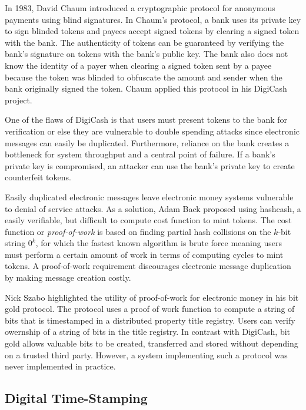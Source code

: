 In 1983, David Chaum introduced a cryptographic protocol for anonymous payments using
blind signatures. In Chaum's protocol, a bank uses its private key to sign
blinded tokens and payees accept signed tokens by clearing a
signed token with the bank\cite{blindsignatures}. The authenticity of tokens can
be guaranteed by verifying the bank's signature on tokens with the bank's public
key. The bank also does not know the identity of a payer when clearing a signed
token sent by a payee because the token was blinded to obfuscate the amount and
sender when the bank
originally signed the token. Chaum applied this protocol in his DigiCash project.

One of the flaws of DigiCash is that users must present tokens to
the bank for verification or else they are vulnerable to double spending attacks
since electronic messages can easily be duplicated\cite{camp1995}. Furthermore,
reliance on the bank creates a bottleneck for system throughput and a central
point of failure. If a bank's private key is compromised, an attacker can use
the bank's private key to create counterfeit tokens.

Easily duplicated electronic messages leave electronic money systems vulnerable
to denial of service attacks. As a solution, Adam Back proposed using hashcash, a
easily verifiable, but difficult to compute cost function to mint
tokens. The cost function or \textit{proof-of-work} is based on finding partial hash
collisions on the $k$-bit string $0^{k}$, for which the fastest known algorithm
is brute force meaning users must perform a certain amount of work in terms of
computing cycles to mint tokens\cite{hashcash}. A proof-of-work requirement discourages
electronic message duplication by making message creation costly.

Nick Szabo highlighted the utility of proof-of-work for electronic money in his bit gold protocol. The protocol
uses a proof of work function to compute a string of bits that is timestamped in a distributed property title registry\cite{bitgold}. Users can
verify owernship of a string of bits in the title registry. In contrast with
DigiCash, bit gold allows valuable bits to be created,
transferred and stored without depending on a trusted third party. However, a
system implementing such a protocol was never implemented in practice.

\subsection{Digital Time-Stamping}

